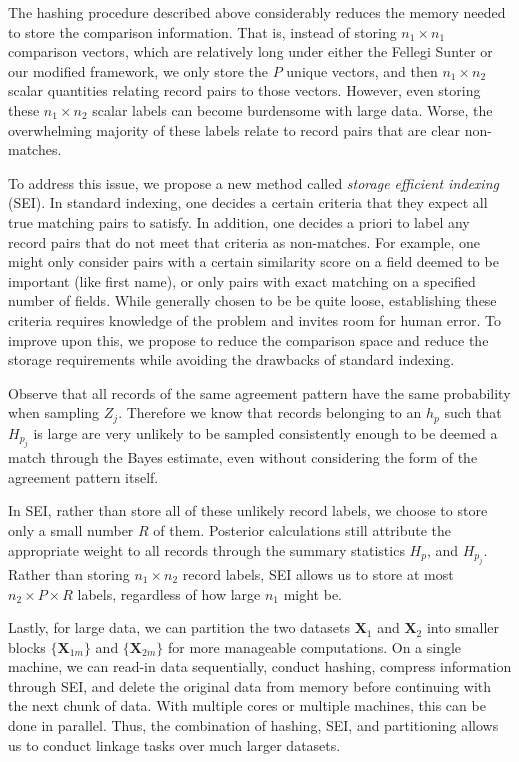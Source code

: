 \documentclass[12pt,letterpaper]{article}
\newcommand{\1}[1]{\mathbb{I}\!\left[#1\right]} %
\begin{document}
The hashing procedure described above considerably reduces the memory
needed to store the comparison information. That is, instead of storing
\(n_1 \times n_1\) comparison vectors, which are relatively long under
either the Fellegi Sunter or our modified framework, we only store the
\(P\) unique vectors, and then \(n_1 \times n_2\) scalar quantities
relating record pairs to those vectors. However, even storing these
\(n_1 \times n_2\) scalar labels can become burdensome with large data.
Worse, the overwhelming majority of these labels relate to record pairs
that are clear non-matches.

To address this issue, we propose a new method called \emph{storage	efficient indexing} (SEI). In standard indexing, one decides a certain criteria that they expect all true matching pairs to satisfy. In addition, one decides 
a priori to label any record pairs that do not meet that criteria as
non-matches. For example, one might only consider pairs with a certain
similarity score on a field deemed to be important (like first name), or
only pairs with exact matching on a specified number of fields. While
generally chosen to be be quite loose, establishing these criteria
requires knowledge of the problem and invites room for human error. 
To improve upon this, we propose to reduce the comparison space and reduce the storage requirements while avoiding the drawbacks of standard indexing. 

Observe that all records of the same
agreement pattern have the same probability when sampling \(Z_j\).
Therefore we know that records belonging to an \(h_p\) such that
\(H_{p_j}\) is large are very unlikely to be sampled consistently enough
to be deemed a match through the Bayes estimate, even without
considering the form of the agreement pattern itself.

In SEI, rather than store all of these unlikely record labels, we choose
to store only a small number \(R\) of them. Posterior calculations still
attribute the appropriate weight to all records through the summary
statistics \(H_p\), and \(H_{p_j}\). Rather than storing
\(n_1 \times n_2\) record labels, SEI allows us to store at most
\(n_2 \times P \times R\) labels, regardless of how large \(n_1\) might be.

Lastly, for large data, we can partition the two datasets \(\bm{X}_1\) and
\(\bm{X}_2\) into smaller blocks \(\{\bm{X}_{1m}\}\) and \(\{\bm{X}_{2m}\}\) for more
manageable computations. On a single machine, we can read-in data
sequentially, conduct hashing, compress information through SEI, and
delete the original data from memory before continuing with the next
chunk of data. With multiple cores or multiple machines, this can be
done in parallel. Thus, the combination of hashing, SEI, and partitioning
allows us to conduct linkage tasks over much larger datasets.
\end{document}
